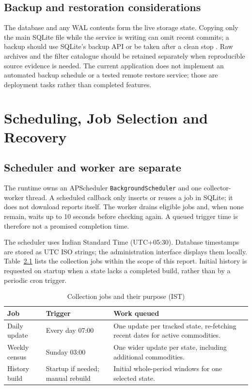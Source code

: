 \documentclass[12pt,a4paper,oneside]{report}
\numberwithin{equation}{chapter}
\numberwithin{figure}{chapter}
\numberwithin{table}{chapter}
\theoremstyle{definition}
\begin{document}
\section{Backup and restoration considerations}
The database and any WAL contents form the live storage state. Copying only the main SQLite file while the service is writing can omit recent commits; a backup should use SQLite's backup API or be taken after a clean stop \cite{sqlitebackup}. Raw archives and the filter catalogue should be retained separately when reproducible source evidence is needed. The current application does not implement an automated backup schedule or a tested remote restore service; those are deployment tasks rather than completed features.

\chapter{Scheduling, Job Selection and Recovery}

\section{Scheduler and worker are separate}
\label{sec:jobs}
The runtime owns an APScheduler \texttt{BackgroundScheduler} and one collector-worker thread. A scheduled callback only inserts or reuses a job in SQLite; it does not download reports itself. The worker drains eligible jobs and, when none remain, waits up to 10 seconds before checking again. A queued trigger time is therefore not a promised completion time.

The scheduler uses Indian Standard Time (UTC+05:30). Database timestamps are stored as UTC ISO strings; the administration interface displays them locally. Table~\ref{tab:jobs} lists the collection jobs within the scope of this report. Initial history is requested on startup when a state lacks a completed build, rather than by a periodic cron trigger.

\begin{table}[H]
\centering
\caption{Collection jobs and their purpose (IST)}
\label{tab:jobs}
\small
\begin{tabular}{@{}p{}p{}p{}@{}}
\toprule
Job & Trigger & Work queued \\
\midrule
Daily update & Every day 07:00 & One update per tracked state, re-fetching recent dates for active commodities. \\
Weekly census & Sunday 03:00 & One wider update per state, including additional commodities. \\
History build & Startup if needed; manual rebuild & Initial whole-period windows for one selected state. \\
\bottomrule
\end{tabular}
\end{table}
\end{document}
